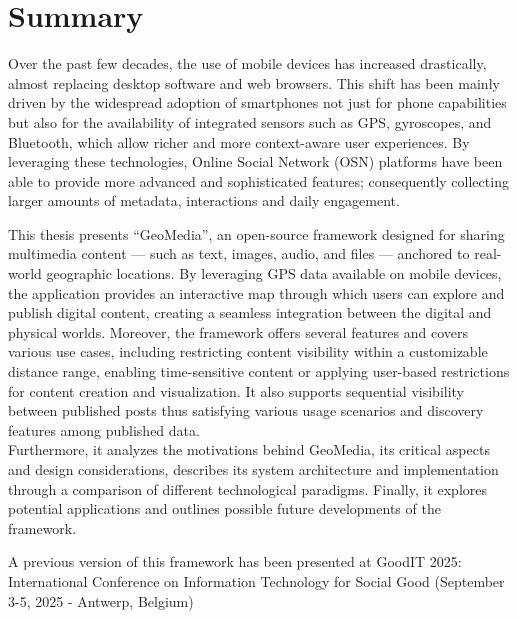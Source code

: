 \cleardoublepage
{}
{}
\begingroup
\let\clearpage\relax
\let\cleardoublepage\relax
\let\cleardoublepage\relax

\chapter*{Summary}


Over the past few decades, the use of mobile devices has increased drastically, almost replacing desktop software and web browsers. This shift has been mainly driven by the widespread adoption of smartphones not just for phone capabilities but also for the availability of integrated sensors such as GPS, gyroscopes, and Bluetooth, which allow richer and more context-aware user experiences. By leveraging these technologies, Online Social Network (OSN) platforms have been able to provide more advanced and sophisticated features; consequently collecting larger amounts of metadata, interactions and daily engagement.

This thesis presents ``GeoMedia'', an open-source framework designed for sharing multimedia content — such as text, images, audio, and files — anchored to real-world geographic locations. By leveraging GPS data available on mobile devices, the application provides an interactive map through which users can explore and publish digital content, creating a seamless integration between the digital and physical worlds. Moreover, the framework offers several features and covers various use cases, including restricting content visibility within a customizable distance range, enabling time-sensitive content or applying user-based restrictions for content creation and visualization. It also supports sequential visibility between published posts thus satisfying various usage scenarios and discovery features among published data. \\ Furthermore, it analyzes the motivations behind GeoMedia, its critical aspects and design considerations, describes its system architecture and implementation through a comparison of different technological paradigms. Finally, it explores potential applications and outlines possible future developments of the framework.

\vspace{1em}

A previous version of this framework has been presented at GoodIT 2025: International Conference on Information Technology for Social Good (September 3-5, 2025 - Antwerp, Belgium) \cite{site:goodit}





\endgroup

\vfill
